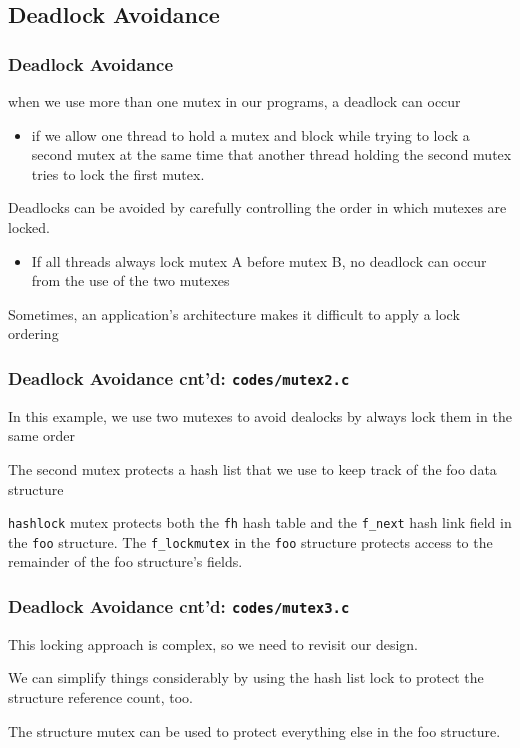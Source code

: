 \documentclass[newPxFont,sthlmFooter,nooffset]{beamer}
\begin{document}
\subsection{Deadlock Avoidance}
\begin{frame}[t]
  \frametitle{Deadlock Avoidance}
when we use more than one mutex in our programs, a deadlock can occur
\begin{itemize}
\item  if we allow one thread to hold a mutex and
  block while trying to lock a second mutex at the same time that
  another thread holding the second mutex tries to lock the first
  mutex.
\end{itemize}
Deadlocks can be avoided by carefully controlling the order in which mutexes are locked.
\begin{itemize}
\item If all threads always lock mutex A before mutex B, no deadlock can occur from the use of the two mutexes
\end{itemize}

Sometimes, an application’s architecture makes it difficult to apply a lock ordering
\end{frame}


\begin{frame}
  \frametitle{Deadlock Avoidance cnt'd: \texttt{codes/mutex2.c}}
In this example, we use two mutexes to avoid dealocks by always lock them in the same order

The second mutex protects a hash list that we use to keep track of the foo data structure

\texttt{hashlock} mutex protects both the \texttt{fh} hash table and the \texttt{f\_next} hash link field in the \texttt{foo} structure. The \texttt{f\_lockmutex} in the \texttt{foo} structure protects access to the remainder of the foo structure’s fields.

  


\end{frame}

\begin{frame}
  \frametitle{Deadlock Avoidance cnt'd: \texttt{codes/mutex3.c}}
This locking approach is complex, so we need to revisit our design. 

We can simplify things considerably by using the hash list lock to protect the structure reference count, too. 

The structure mutex can be used to protect everything else in the foo structure.
  

\end{frame}
\end{document}
